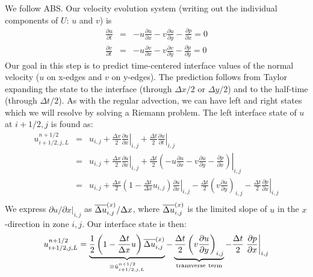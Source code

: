 We follow ABS.  Our velocity evolution system (writing out the
individual components of $U$: $u$ and $v$) is
\begin{eqnarray}
\frac{\partial u}{\partial t} &=& -u \frac{\partial u}{\partial x} 
                                  -v \frac{\partial u}{\partial y} 
                                  -\frac{\partial p}{\partial x} = 0 \\
\frac{\partial v}{\partial t} &=& -u \frac{\partial v}{\partial x} 
                                  -v \frac{\partial v}{\partial y} 
                                  -\frac{\partial p}{\partial y} = 0 
\end{eqnarray}
Our goal in this step is to predict time-centered interface values of
the normal velocity ($u$ on x-edges and $v$ on y-edges).  The
prediction follows from Taylor expanding the state to the interface
(through $\Delta x/2$ or $\Delta y/2$) and to the half-time (through
$\Delta t/2$).  As with the regular advection, we can have left and
right states which we will resolve by solving a Riemann problem.  The
left interface state of $u$ at $i+1/2,j$ is found as:
\begin{eqnarray}
u_{i+1/2,j,L}^{n+1/2} 
  &=& u_{i,j} 
    + \frac{\Delta x}{2} \left . \frac{\partial u}{\partial x} \right |_{i,j}
    + \frac{\Delta t}{2} \left . \frac{\partial u}{\partial t} \right |_{i,j}\\
  &=& u_{i,j} 
    + \frac{\Delta x}{2} \left . \frac{\partial u}{\partial x} \right |_{i,j}
    + \frac{\Delta t}{2} \left . \left (-u \frac{\partial u}{\partial x}
                                -v \frac{\partial u}{\partial y}
                                -\frac{\partial p}{\partial x} \right ) \right |_{i,j}\\
  &=& u_{i,j} 
    + \frac{\Delta x}{2} \left ( 1 - \frac{\Delta t}{\Delta x} u_{i,j} \right )
                         \left .  \frac{\partial u}{\partial x}\right |_{i,j}
    - \frac{\Delta t}{2} \left ( v \frac{\partial u}{\partial y}\right )_{i,j}
    - \frac{\Delta t}{2} \left . \frac{\partial p}{\partial x} \right |_{i,j}\\
\end{eqnarray}
We express ${\partial u}/{\partial x} |_{i,j}$ as $\overline{\Delta u}^{(x)}_{i,j} / \Delta
x$, where $\overline{\Delta u}^{(x)}_{i,j}$ is the limited slope of $u$ in the
$x$-direction in zone $i,j$.  Our interface state is then:
\begin{equation}
u_{i+1/2,j,L}^{n+1/2} 
    = \underbrace{\frac{1}{2} \left ( 1 - \frac{\Delta t}{\Delta x} u \right ) \overline{\Delta u}^{(x)}_{i,j}}_{\equiv \hat{u}_{i+1/2,j,L}^{n+1/2}}
    - \underbrace{\frac{\Delta t}{2} \left ( v \frac{\partial u}{\partial y} \right )_{i,j}}_{\mathrm{transverse~term}}
    - \frac{\Delta t}{2} \left . \frac{\partial p}{\partial x} \right |_{i,j}
\label{eq:uMAC_l}
\end{equation} 


